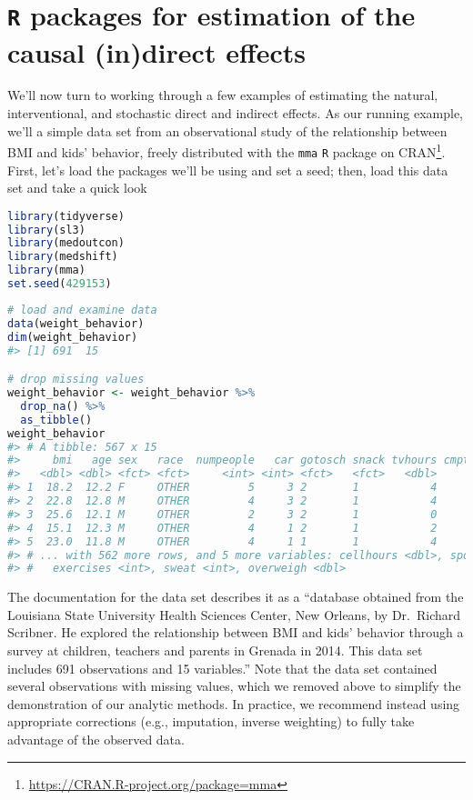 \documentclass[
  12pt,
]{book}
\newcommand{\passthrough}[1]{#1}
\renewcommand{\href}[2]{#2\footnote{\url{#1}}}
\theoremstyle{definition}
\theoremstyle{definition}
\theoremstyle{definition}
\newcommand{\1}{\mathbbm{1}}
\begin{document}
\hypertarget{r-packages-for-estimation-of-the-causal-indirect-effects}{%
\chapter{\texorpdfstring{\texttt{R} packages for estimation of the causal (in)direct effects}{R packages for estimation of the causal (in)direct effects}}\label{r-packages-for-estimation-of-the-causal-indirect-effects}}

We'll now turn to working through a few examples of estimating the natural,
interventional, and stochastic direct and indirect effects. As our running
example, we'll a simple data set from an observational study of the relationship
between BMI and kids' behavior, freely distributed with the \href{https://CRAN.R-project.org/package=mma}{\passthrough{\lstinline!mma!} \passthrough{\lstinline!R!} package
on CRAN}. First, let's load the packages
we'll be using and set a seed; then, load this data set and take a quick look

\begin{lstlisting}[language=R]
library(tidyverse)
library(sl3)
library(medoutcon)
library(medshift)
library(mma)
set.seed(429153)
\end{lstlisting}

\begin{lstlisting}[language=R]
# load and examine data
data(weight_behavior)
dim(weight_behavior)
#> [1] 691  15

# drop missing values
weight_behavior <- weight_behavior %>%
  drop_na() %>%
  as_tibble()
weight_behavior
#> # A tibble: 567 x 15
#>     bmi   age sex   race  numpeople   car gotosch snack tvhours cmpthours
#>   <dbl> <dbl> <fct> <fct>     <int> <int> <fct>   <fct>   <dbl>     <dbl>
#> 1  18.2  12.2 F     OTHER         5     3 2       1           4         0
#> 2  22.8  12.8 M     OTHER         4     3 2       1           4         2
#> 3  25.6  12.1 M     OTHER         2     3 2       1           0         2
#> 4  15.1  12.3 M     OTHER         4     1 2       1           2         1
#> 5  23.0  11.8 M     OTHER         4     1 1       1           4         3
#> # ... with 562 more rows, and 5 more variables: cellhours <dbl>, sports <fct>,
#> #   exercises <int>, sweat <int>, overweigh <dbl>
\end{lstlisting}

The documentation for the data set describes it as a ``database obtained from the
Louisiana State University Health Sciences Center, New Orleans, by Dr.~Richard
Scribner. He explored the relationship between BMI and kids' behavior through a
survey at children, teachers and parents in Grenada in 2014. This data set
includes 691 observations and 15 variables.'' Note that the data set contained
several observations with missing values, which we removed above to simplify the
demonstration of our analytic methods. In practice, we recommend instead using
appropriate corrections (e.g., imputation, inverse weighting) to fully take
advantage of the observed data.
\end{document}
